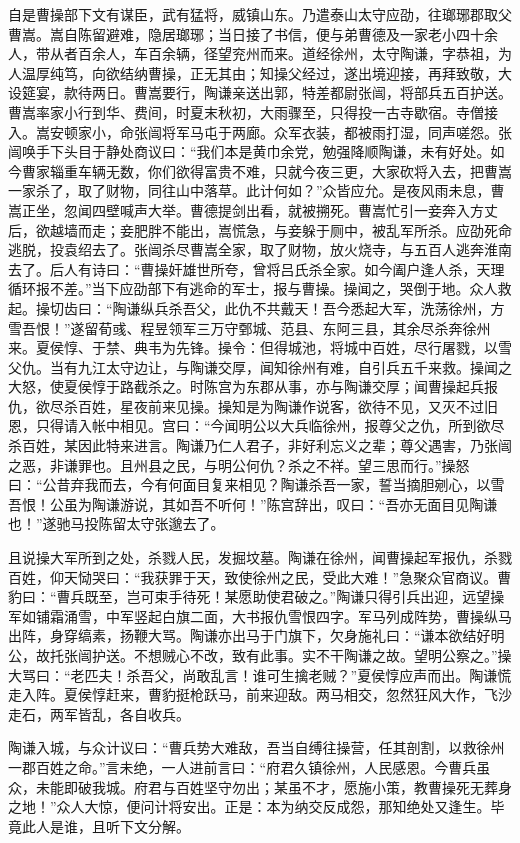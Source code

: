 自是曹操部下文有谋臣，武有猛将，威镇山东。乃遣泰山太守应劭，往瑯琊郡取父曹嵩。嵩自陈留避难，隐居瑯琊；当日接了书信，便与弟曹德及一家老小四十余人，带从者百余人，车百余辆，径望兖州而来。道经徐州，太守陶谦，字恭祖，为人温厚纯笃，向欲结纳曹操，正无其由；知操父经过，遂出境迎接，再拜致敬，大设筵宴，款待两日。曹嵩要行，陶谦亲送出郭，特差都尉张闿，将部兵五百护送。曹嵩率家小行到华、费间，时夏末秋初，大雨骤至，只得投一古寺歇宿。寺僧接入。嵩安顿家小，命张闿将军马屯于两廊。众军衣装，都被雨打湿，同声嗟怨。张闿唤手下头目于静处商议曰：“我们本是黄巾余党，勉强降顺陶谦，未有好处。如今曹家辎重车辆无数，你们欲得富贵不难，只就今夜三更，大家砍将入去，把曹嵩一家杀了，取了财物，同往山中落草。此计何如？”众皆应允。是夜风雨未息，曹嵩正坐，忽闻四壁喊声大举。曹德提剑出看，就被搠死。曹嵩忙引一妾奔入方丈后，欲越墙而走；妾肥胖不能出，嵩慌急，与妾躲于厕中，被乱军所杀。应劭死命逃脱，投袁绍去了。张闿杀尽曹嵩全家，取了财物，放火烧寺，与五百人逃奔淮南去了。后人有诗曰：“曹操奸雄世所夸，曾将吕氏杀全家。如今阖户逢人杀，天理循环报不差。”当下应劭部下有逃命的军士，报与曹操。操闻之，哭倒于地。众人救起。操切齿曰：“陶谦纵兵杀吾父，此仇不共戴天！吾今悉起大军，洗荡徐州，方雪吾恨！”遂留荀彧、程昱领军三万守鄄城、范县、东阿三县，其余尽杀奔徐州来。夏侯惇、于禁、典韦为先锋。操令：但得城池，将城中百姓，尽行屠戮，以雪父仇。当有九江太守边让，与陶谦交厚，闻知徐州有难，自引兵五千来救。操闻之大怒，使夏侯惇于路截杀之。时陈宫为东郡从事，亦与陶谦交厚；闻曹操起兵报仇，欲尽杀百姓，星夜前来见操。操知是为陶谦作说客，欲待不见，又灭不过旧恩，只得请入帐中相见。宫曰：“今闻明公以大兵临徐州，报尊父之仇，所到欲尽杀百姓，某因此特来进言。陶谦乃仁人君子，非好利忘义之辈；尊父遇害，乃张闿之恶，非谦罪也。且州县之民，与明公何仇？杀之不祥。望三思而行。”操怒曰：“公昔弃我而去，今有何面目复来相见？陶谦杀吾一家，誓当摘胆剜心，以雪吾恨！公虽为陶谦游说，其如吾不听何！”陈宫辞出，叹曰：“吾亦无面目见陶谦也！”遂驰马投陈留太守张邈去了。

且说操大军所到之处，杀戮人民，发掘坟墓。陶谦在徐州，闻曹操起军报仇，杀戮百姓，仰天恸哭曰：“我获罪于天，致使徐州之民，受此大难！”急聚众官商议。曹豹曰：“曹兵既至，岂可束手待死！某愿助使君破之。”陶谦只得引兵出迎，远望操军如铺霜涌雪，中军竖起白旗二面，大书报仇雪恨四字。军马列成阵势，曹操纵马出阵，身穿缟素，扬鞭大骂。陶谦亦出马于门旗下，欠身施礼曰：“谦本欲结好明公，故托张闿护送。不想贼心不改，致有此事。实不干陶谦之故。望明公察之。”操大骂曰：“老匹夫！杀吾父，尚敢乱言！谁可生擒老贼？”夏侯惇应声而出。陶谦慌走入阵。夏侯惇赶来，曹豹挺枪跃马，前来迎敌。两马相交，忽然狂风大作，飞沙走石，两军皆乱，各自收兵。

陶谦入城，与众计议曰：“曹兵势大难敌，吾当自缚往操营，任其剖割，以救徐州一郡百姓之命。”言未绝，一人进前言曰：“府君久镇徐州，人民感恩。今曹兵虽众，未能即破我城。府君与百姓坚守勿出；某虽不才，愿施小策，教曹操死无葬身之地！”众人大惊，便问计将安出。正是：本为纳交反成怨，那知绝处又逢生。毕竟此人是谁，且听下文分解。